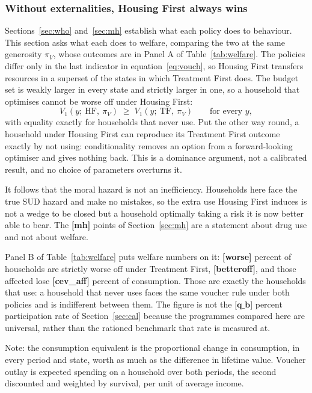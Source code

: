 \documentclass[10pt]{article}
\newcommand{\notes}[2]{\par\vspace{0.4em}%
  \begin{minipage}{#1}\footnotesize #2\end{minipage}}
\newcommand{\tabnote}[1]{\notes{\wd\ntbox}{#1}}
\begin{document}
\subsubsection{Without externalities, Housing First always wins}\label{sec:nox}

Sections~\ref{sec:who} and~\ref{sec:mh} establish what each policy does to
behaviour. This section asks what each does to welfare, comparing the two at the
same generosity $\pi_V$, whose outcomes are in Panel A of
Table~\ref{tab:welfare}. The policies differ only in the last indicator in
equation~\eqref{eq:vouch}, so Housing First transfers resources in a superset of
the states in which Treatment First does. The budget set is weakly larger in
every state and strictly larger in one, so a household that optimises cannot be
worse off under Housing First:
\begin{equation}\label{eq:dom}
V_1(y;\ \text{HF},\ \pi_V) \;\ge\; V_1(y;\ \text{TF},\ \pi_V)
\qquad \text{for every } y,
\end{equation}
with equality exactly for households that never use. Put the other way round, a
household under Housing First can reproduce its Treatment First outcome exactly
by not using: conditionality removes an option from a forward-looking optimiser
and gives nothing back. This is a dominance argument, not a calibrated result,
and no choice of parameters overturns it.

It follows that the moral hazard is not an inefficiency. Households here face the
true SUD hazard and make no mistakes, so the extra use Housing First
induces is not a wedge to be closed but a household optimally taking a risk it
is now better able to bear. The \textbf{[mh]} points of Section~\ref{sec:mh} are a
statement about drug use and not about welfare.

Panel B of
Table~\ref{tab:welfare} puts welfare numbers on it: \textbf{[worse]} percent of households are
strictly worse off under Treatment First, \textbf{[betteroff]}, and those affected
lose \textbf{[cev_aff]} percent of consumption. Those are exactly the households
that use: a household that never uses faces the same voucher rule under both
policies and is indifferent between them. The figure is not the $\textbf{[q_b]}$
percent participation rate of Section~\ref{sec:cal} because the programmes
compared here are universal, rather than the rationed benchmark that rate is
measured at.

\begin{table}[!tb]
\centering
\caption{Welfare at universal cover, with no externality}\label{tab:welfare}
\sbox{\ntbox}{}\usebox{\ntbox}
\tabnote{Note: the consumption equivalent is the proportional change
in consumption, in every period and state, worth as much as the difference in
lifetime value. Voucher outlay is expected spending on a household over both
periods, the second discounted and weighted by survival, per unit of average
income.}
\end{table}
\end{document}
